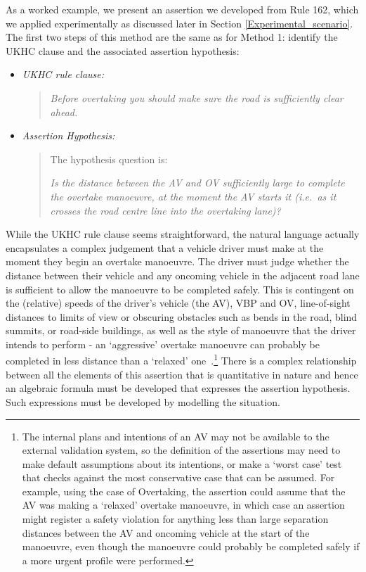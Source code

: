As a worked example, we present an assertion we developed from Rule 162, which we applied experimentally as discussed later in Section \ref{Experimental_scenario}.
The first two steps of this method are the same as for Method 1: identify the UKHC clause and the associated assertion hypothesis:
\begin{itemize}
	\item \emph{UKHC rule clause:}
		\begin{quote}
			\textit{Before overtaking you should make sure the road is sufficiently clear ahead.}
		\end{quote}
	\item \emph{Assertion Hypothesis:}
	\begin{quote}
		The hypothesis question is:
		
		 \textit{Is the distance between the AV and OV sufficiently large to complete the overtake manoeuvre, at the moment the AV starts it (i.e.\ as it crosses the road centre line into the overtaking lane)?}
	\end{quote}
\end{itemize}
While the UKHC rule clause seems straightforward, the natural language actually encapsulates a complex judgement that a vehicle driver must make at the moment they begin an overtake manoeuvre. The driver must judge whether the distance between their vehicle and any oncoming vehicle in the adjacent road lane is sufficient to allow the manoeuvre to be completed safely. This is contingent on the (relative) speeds of the driver's vehicle (the AV), VBP and OV, line-of-sight distances to limits of view or obscuring obstacles such as bends in the road, blind summits, or road-side buildings, as well as the style of manoeuvre that the driver intends to perform - an `aggressive' overtake manoeuvre can probably be completed in less distance than a `relaxed' one~\cite{decastro2018counterexample, tkachenko2018line}.\footnote{The internal plans and intentions of an AV may not be available to the external validation system, so the definition of the assertions may need to make default assumptions about its intentions, or make a `worst case' test that checks against the most conservative case that can be assumed. For example, using the case of Overtaking, the assertion could assume that the AV was making a `relaxed' overtake manoeuvre, in which case an assertion might register a safety violation for anything less than large separation distances between the AV and oncoming vehicle at the start of the manoeuvre, even though the manoeuvre could probably be completed safely if a more urgent profile were performed.} There is a complex relationship between all the elements of this assertion that is quantitative in nature and hence an algebraic formula must be developed that expresses the assertion hypothesis. Such expressions must be developed by modelling the situation.

